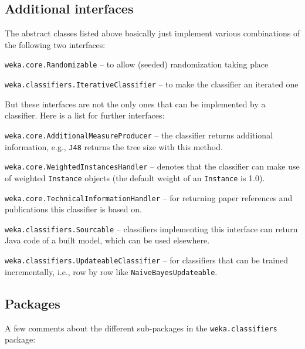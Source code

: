 \subsection{Additional interfaces}
The abstract classes listed above basically just implement various combinations
of the following two interfaces:
\begin{tight_itemize}
  \item \texttt{weka.core.Randomizable} -- to allow (seeded) randomization
taking place
  \item \texttt{weka.classifiers.IterativeClassifier} -- to make the classifier
an iterated one
\end{tight_itemize}
But these interfaces are not the only ones that can be implemented by
a classifier. Here is a list for further interfaces:
\begin{tight_itemize}
  \item \texttt{weka.core.AdditionalMeasureProducer} -- the classifier returns
additional information, e.g., \texttt{J48} returns the tree size with this
method.
  \item \texttt{weka.core.WeightedInstancesHandler} -- denotes that the
classifier can make use of weighted \texttt{Instance} objects (the
default weight of an \texttt{Instance} is 1.0).
  \item \texttt{weka.core.TechnicalInformationHandler} -- for returning paper
references and publications this classifier is based on.
  \item \texttt{weka.classifiers.Sourcable} -- classifiers implementing this
interface can return Java code of a built model, which can be used elsewhere.
  \item \texttt{weka.classifiers.UpdateableClassifier} -- for classifiers that
can be trained incrementally, i.e., row by row like
\texttt{NaiveBayesUpdateable}.
\end{tight_itemize}

\pagebreak
\subsection{Packages}
A few comments about the different sub-packages in the \texttt{weka.classifiers}
package:

